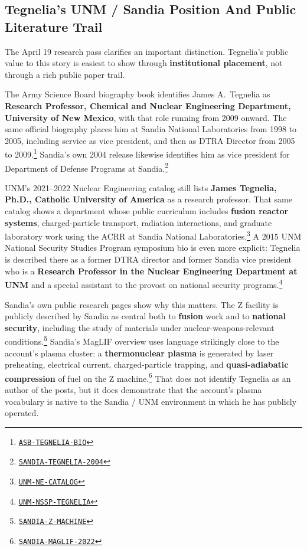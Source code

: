\documentclass[11pt]{article}
\newcommand{\src}[2]{\href{#1}{\texttt{#2}}}
\begin{document}
\subsection{Tegnelia's UNM / Sandia Position And Public Literature Trail}

The April 19 research pass clarifies an important distinction. Tegnelia's public value to this story is easiest to show through \textbf{institutional placement}, not through a rich public paper trail.

The Army Science Board biography book identifies James A.\ Tegnelia as \textbf{Research Professor, Chemical and Nuclear Engineering Department, University of New Mexico}, with that role running from 2009 onward. The same official biography places him at Sandia National Laboratories from 1998 to 2005, including service as vice president, and then as DTRA Director from 2005 to 2009.\footnote{\src{https://asb.army.mil/Portals/105/Biography\%20Books/2013\_ASB\_Bio\_Book\%20130614.pdf}{ASB-TEGNELIA-BIO}} Sandia's own 2004 release likewise identifies him as vice president for Department of Defense Programs at Sandia.\footnote{\src{https://newsreleases.sandia.gov/sandias-vp-jim-tegnelia-named-chairman-of-the-army-science-board/}{SANDIA-TEGNELIA-2004}}

UNM's 2021--2022 Nuclear Engineering catalog still lists \textbf{James Tegnelia, Ph.D., Catholic University of America} as a research professor. That same catalog shows a department whose public curriculum includes \textbf{fusion reactor systems}, charged-particle transport, radiation interactions, and graduate laboratory work using the ACRR at Sandia National Laboratories.\footnote{\src{https://catalog.unm.edu/catalogs/2021-2022/colleges/engineering/nuclear-engineering/index.html}{UNM-NE-CATALOG}} A 2015 UNM National Security Studies Program symposium bio is even more explicit: Tegnelia is described there as a former DTRA director and former Sandia vice president who is a \textbf{Research Professor in the Nuclear Engineering Department at UNM} and a special assistant to the provost on national security programs.\footnote{\src{https://nssp.unm.edu/symposium/speaker-bios-2015-symposium.pdf}{UNM-NSSP-TEGNELIA}}

Sandia's own public research pages show why this matters. The Z facility is publicly described by Sandia as central both to \textbf{fusion} work and to \textbf{national security}, including the study of materials under nuclear-weapons-relevant conditions.\footnote{\src{https://www.sandia.gov/z-machine/}{SANDIA-Z-MACHINE}} Sandia's MagLIF overview uses language strikingly close to the account's plasma cluster: a \textbf{thermonuclear plasma} is generated by laser preheating, electrical current, charged-particle trapping, and \textbf{quasi-adiabatic compression} of fuel on the Z machine.\footnote{\src{https://www.sandia.gov/research/publications/details/an-overview-of-magneto-inertial-fusion-on-the-z-machine-at-sandia-national-2022-04-01/}{SANDIA-MAGLIF-2022}} That does not identify Tegnelia as an author of the posts, but it does demonstrate that the account's plasma vocabulary is native to the Sandia / UNM environment in which he has publicly operated.
\end{document}
